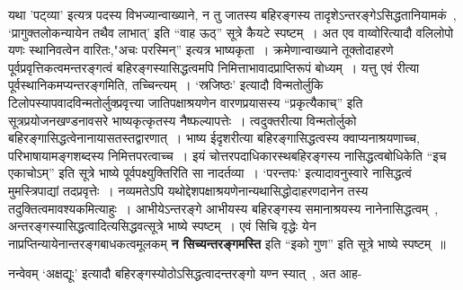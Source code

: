 यथा 'पट्व्या' इत्यत्र पदस्य विभज्यान्वाख्याने, न तु जातस्य बहिरङ्गस्य तादृशेऽन्तरङ्गेऽसिद्धतानियामकं~, `प्रागुक्तलोकन्यायेन तथैव लाभात्' इति ``वाह ऊठ्'' सूत्रे कैयटे स्पष्टम्~।
अत एव वाय्वोरित्यादौ वलिलोपो यणः स्थानिवत्वेन वारितः,"अचः परस्मिन्'' इत्यत्र भाष्यकृता~।
क्रमेणान्वाख्याने तूक्तोदाहरणे पूर्वप्रवृत्तिकत्वमन्तरङ्गत्वं बहिरङ्गस्यासिद्धत्वमपि निमित्ताभावादप्राप्तिरूपं बोध्यम्~।
यत्तु एवं रीत्या पूर्वस्थानिकमप्यन्तरङ्गमिति, तच्चिन्त्यम्~।
 `स्रजिष्ठः' इत्यादौ विन्मतोर्लुकि टिलोपस्यापवादविन्मतोर्लुक्प्रवृत्त्या जातिपक्षाश्रयणेन वारणप्रयासस्य ``प्रकृत्यैकाच्'' इति सूत्रप्रयोजनखण्डनावसरे भाष्यकृत्कृतस्य नैष्फल्यापत्तेः~।
त्वदुक्तरीत्या विन्मतोर्लुको बहिरङ्गासिद्धत्वेनानायासतस्तद्वारणात्~।
भाष्य ईदृशरीत्या बहिरङ्गासिद्धत्वस्य क्वाप्यनाश्रयणाच्च, परिभाषायामङ्गशब्दस्य निमित्तपरत्वाच्च~।
इयं चोत्तरपदाधिकारस्थबहिरङ्गस्य नासिद्धत्वबोधिकेति ``इच एकाचोऽम्'' इति सूत्रे भाष्ये पूर्वपक्ष्युक्तिरिति सा नादर्तव्या~।
`परन्तपः' इत्यादावनुस्वारे नासिद्धत्वं मुमस्त्रिपाद्यां तदप्रवृत्तेः~।
नव्यमतेऽपि यथोद्देशपक्षाश्रयणेनान्यथासिद्धोदाहरणदानेन तस्य तदुक्तित्वमावश्यकमित्याहुः~।
आभीयेऽन्तरङ्गे आभीयस्य बहिरङ्गस्य समानाश्रयस्य नानेनासिद्धत्वम्~, अन्तरङ्गस्यासिद्धत्वादित्यसिद्धवत्सूत्रे भाष्ये स्पष्टम्~।
एवं सिचि वृद्धेः येन नाप्रप्तिन्यायेनान्तरङ्गबाधकत्वमूलकम् {\bfseries न सिच्यन्तरङ्गमस्ति} इति ``इको गुण'' इति सूत्रे भाष्ये स्पष्टम्~॥\par
नन्वेवम् `अक्षद्यूः' इत्यादौ बहिरङ्गस्योठोऽसिद्धत्वादन्तरङ्गो यण्न स्यात्~, अत आह-
